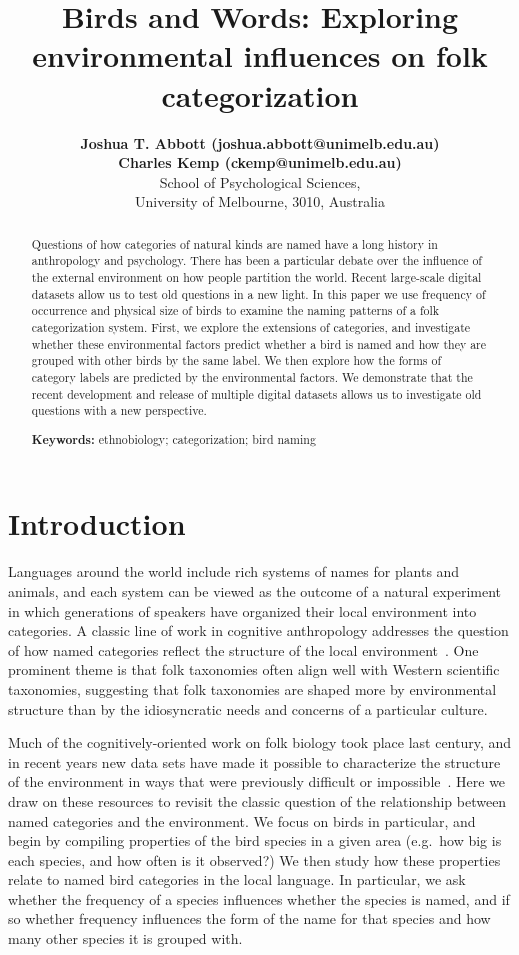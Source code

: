 \documentclass[10pt,letterpaper]{article}
\title{Birds and Words: Exploring environmental influences on folk categorization}
\author{{\large \bf Joshua T. Abbott (joshua.abbott@unimelb.edu.au)} \\
 {\large \bf Charles Kemp (ckemp@unimelb.edu.au)} \\
  School of Psychological Sciences,  \\
  University of Melbourne, 3010, Australia}
\begin{document}
\maketitle


\begin{abstract}
Questions of how categories of natural kinds are named have a long history in anthropology and psychology. There has been a particular debate over the influence of the external environment on how people partition the world. Recent large-scale digital datasets allow us to test old questions in a new light. In this paper we use frequency of occurrence and physical size of birds to examine the naming patterns of a folk categorization system. First, we explore the extensions of categories, and investigate whether these environmental factors predict whether a bird is named and how they are grouped with other birds by the same label. We then explore how the forms of category labels are predicted by the environmental factors. We demonstrate that the recent development and release of multiple digital datasets allows us to investigate old questions with a new perspective.

\textbf{Keywords:} 
ethnobiology; categorization; bird naming
\end{abstract}


\section{Introduction}

Languages around the world include rich systems of names for plants and animals, and each system can be viewed as the outcome of a natural experiment in which generations of speakers have organized their local environment into categories. A classic line of work in cognitive anthropology addresses the question of how named categories reflect the structure of the local environment~\cite{berlin2014ethnobiological}. One prominent theme is that folk taxonomies often align well with Western scientific taxonomies, suggesting that folk taxonomies are shaped more by environmental structure than by the idiosyncratic needs and concerns of a particular culture. 

Much of the cognitively-oriented work on folk biology took place last century, and in recent years new data sets have made it possible to characterize the structure of the environment in ways that were previously difficult or impossible~\cite{sullivan2009ebird,wilman2014eltontraits}. Here we draw on these resources to revisit the classic question of the relationship between named categories and the environment. We focus on birds in particular, and begin by compiling properties of the bird species in a given area (e.g.\ how big is each species, and how often is it observed?) We then study how these properties relate to named bird categories in the local language. In particular, we ask whether the frequency of a species influences whether the species is named, and if so whether frequency influences the form of the name for that species and how many other species it is grouped with. 
\end{document}
